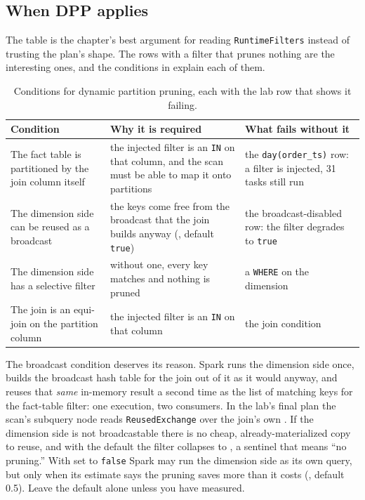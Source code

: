 \subsection{When DPP applies}

The table is the chapter's best argument for reading \texttt{RuntimeFilters}
instead of trusting the plan's shape. The rows with a filter that prunes nothing
are the interesting ones, and the conditions in
 explain each of them.

\begin{table}[htbp]
\centering\footnotesize
\renewcommand{\arraystretch}{1.25}
\begin{tabular}{@{}P{4.3cm}P{5.0cm}P{4.7cm}@{}}
\toprule
\textbf{Condition} & \textbf{Why it is required} & \textbf{What fails without it} \\
\midrule
The fact table is partitioned by the join column itself & the injected filter is an \texttt{IN} on that column, and the scan must be able to map it onto partitions & the \texttt{day(order\_ts)} row: a filter is injected, 31 tasks still run \\
The dimension side can be reused as a broadcast & the keys come free from the broadcast that the join builds anyway (, default \texttt{true}) & the broadcast-disabled row: the filter degrades to \texttt{true} \\
The dimension side has a selective filter & without one, every key matches and nothing is pruned & a \texttt{WHERE} on the dimension \\
The join is an equi-join on the partition column & the injected filter is an \texttt{IN} on that column & the join condition \\
\bottomrule
\end{tabular}
\caption{Conditions for dynamic partition pruning, each with the lab row that
shows it failing.}
\label{tab:pruning-dpp-conditions}
\end{table}

The broadcast condition deserves its reason. Spark runs the dimension side once,
builds the broadcast hash table for the join out of it as it would anyway, and
reuses that \emph{same} in-memory result a second time as the list of matching
keys for the fact-table filter: one execution, two consumers. In the lab's final
plan the scan's subquery node reads \texttt{ReusedExchange} over the join's own
. If the dimension side is not broadcastable there is
no cheap, already-materialized copy to reuse, and with the default
 the filter collapses to
, a sentinel that means ``no pruning.''
With  set to \texttt{false} Spark may run the
dimension side as its own query, but only when its estimate says the pruning
saves more than it costs
(, default
0.5). Leave the default alone unless you have measured.

